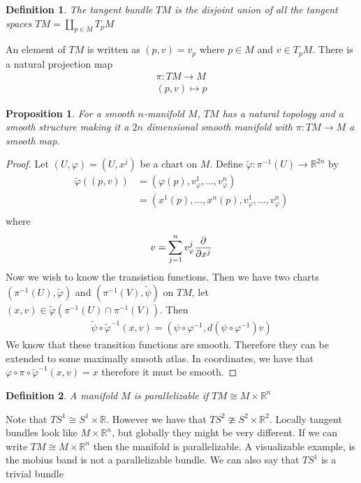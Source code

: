 \documentclass[a4paper]{article}
\newtheorem*{prop}{Proposition}
\newtheorem*{defn}{Definition}
\begin{document}
\begin{defn}
  The tangent bundle $TM$ is the disjoint union of all the tangent spaces $TM = \coprod_{p \in M} T_pM$
\end{defn}

An element of $TM$ is written as $(p,v) = v_p$ where $p \in M$ and $v \in T_pM$. There is a natural projection map 
\[
  \begin{aligned}
  \pi: TM \rightarrow M \\
  (p,v) \mapsto p
  \end{aligned}
\]

\begin{prop}
  For a smooth $n$-manifold $M$, $TM$ has a natural topology and a smooth structure making it a $2n$ dimensional smooth manifold with $\pi: TM \rightarrow M$ a smooth map.
\end{prop}

\begin{proof}
  Let $(U, \varphi) = (U, x^j)$ be a chart on $M$.  Define $\tilde{\varphi}: \pi^{-1}(U) \rightarrow \mathds{R}^{2n}$ by
  \[
    \begin{aligned}
      \tilde{\varphi}((p,v)) &= (\varphi(p), v_{\varphi}^1, \dots, v_{\varphi}^n)\\
                             &= (x^1(p), \dots, x^n(p), v_{\varphi}^1, \dots, v_{\varphi}^n)\\
    \end{aligned}
  \]
  where
  \[
    v = \sum_{j=1}^n v_{\varphi}^j \pdv{}{x^j}
  \]
  Now we wish to know the transistion functions. Then we have two charts $(\pi^{-1}(U), \tilde{\varphi})$ and $(\pi^{-1}(V), \tilde{\psi})$ on $TM$, let $(x,v) \in \tilde{\varphi}(\pi^{-1}(U) \cap \pi^{-1}(V))$. Then 
  \[
    \begin{aligned}
      \tilde{\psi} \circ \tilde{\varphi}^{-1}(x,v) = (\psi \circ \varphi^{-1}, d(\psi \circ \varphi^{-1})v)
    \end{aligned}
  \]
  We know that these transition functions are smooth. Therefore they can be extended to some maximally smooth atlas. In coordinates, we have that $\varphi \circ \pi \circ \tilde{\varphi}^{-1}(x,v) = x$ therefore it must be smooth.
\end{proof}

\begin{defn}
  A manifold $M$ is parallelizable if $TM \cong M \times \mathds{R}^n$
\end{defn}

Note that $TS^1 \cong S^1 \times \mathds{R}$. However we have that $TS^2 \ncong S^2 \times \mathds{R}^2$. Locally tangent bundles look like $M \times \mathds{R}^n$, but globally they might be very different. If we can write $TM \cong M \times \mathds{R}^n$ then the manifold is parallelizable. A visualizable example, is the mobius band is not a parallelizable bundle. We can also say that $TS^1$ is a trivial bundle
\end{document}
